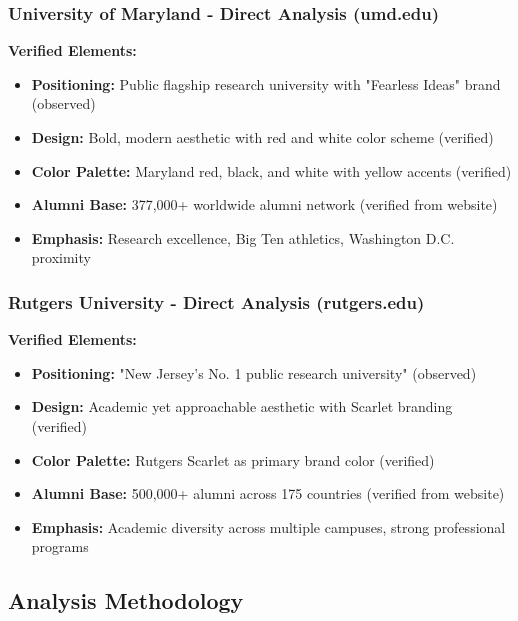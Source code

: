 \documentclass[12pt,letterpaper]{article}
\begin{document}
\subsubsection{University of Maryland - Direct Analysis (umd.edu)}

\textbf{Verified Elements:}
\begin{itemize}[leftmargin=*]
    \item \textbf{Positioning:} Public flagship research university with "Fearless Ideas" brand (observed)
    \item \textbf{Design:} Bold, modern aesthetic with red and white color scheme (verified)
    \item \textbf{Color Palette:} Maryland red, black, and white with yellow accents (verified)
    \item \textbf{Alumni Base:} 377,000+ worldwide alumni network (verified from website)
    \item \textbf{Emphasis:} Research excellence, Big Ten athletics, Washington D.C. proximity
\end{itemize}

\subsubsection{Rutgers University - Direct Analysis (rutgers.edu)}

\textbf{Verified Elements:}
\begin{itemize}[leftmargin=*]
    \item \textbf{Positioning:} "New Jersey's No. 1 public research university" (observed)
    \item \textbf{Design:} Academic yet approachable aesthetic with Scarlet branding (verified)
    \item \textbf{Color Palette:} Rutgers Scarlet as primary brand color (verified)
    \item \textbf{Alumni Base:} 500,000+ alumni across 175 countries (verified from website)
    \item \textbf{Emphasis:} Academic diversity across multiple campuses, strong professional programs
\end{itemize}

\subsection{Analysis Methodology}
\end{document}
